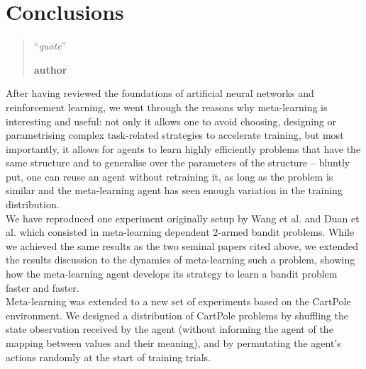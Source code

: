 \chapter{Conclusions}
\begin{quotation}
\noindent ``\emph{quote}''
\begin{flushright}\textbf{author}\end{flushright}
\end{quotation}
\vspace*{0.5cm}

After having reviewed the foundations of artificial neural networks and
reinforcement learning, we went through the reasons why meta-learning is
interesting and useful: not only it allows one to avoid choosing, designing
or parametrising complex task-related strategies to accelerate training, but
most importantly, it allows for agents to learn highly efficiently problems
that have the same structure and to generalise over the parameters of the 
structure -- bluntly put, one can reuse an agent without retraining it, as long
as the problem is similar and the meta-learning agent has seen enough
variation in the training distribution.\\

We have reproduced one experiment originally setup by Wang et al. 
\cite{learningtorl} and Duan et al. \cite{fastrlviaslowrl} which consisted
in meta-learning dependent 2-armed bandit problems. While we achieved the
same results as the two seminal papers cited above, we extended the results
discussion to the dynamics of meta-learning such a problem, showing how
the meta-learning agent develops its strategy to learn a bandit problem faster
and faster.\\

Meta-learning was extended to a new set of experiments based on the CartPole
environment. We designed a distribution of CartPole problems by shuffling
the state observation received by the agent (without informing the agent
of the mapping between values and their meaning), and by permutating 
the agent's actions randomly at the start of training trials.\\

